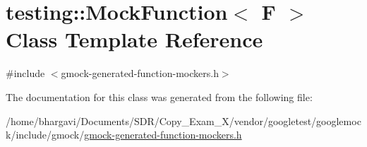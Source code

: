 \hypertarget{classtesting_1_1_mock_function}{}\section{testing\+:\+:Mock\+Function$<$ F $>$ Class Template Reference}
\label{classtesting_1_1_mock_function}


{\ttfamily \#include $<$gmock-\/generated-\/function-\/mockers.\+h$>$}



The documentation for this class was generated from the following file\+:\begin{DoxyCompactItemize}
\item 
/home/bhargavi/\+Documents/\+S\+D\+R/\+Copy\+\_\+\+Exam\+\_\+X/vendor/googletest/googlemock/include/gmock/\hyperlink{gmock-generated-function-mockers_8h}{gmock-\/generated-\/function-\/mockers.\+h}\end{DoxyCompactItemize}
